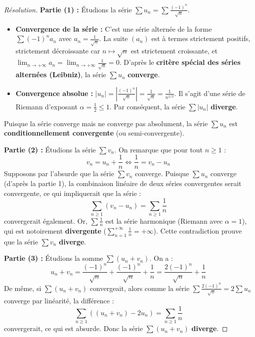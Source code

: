 \documentclass[12pt,a4paper]{report}
\begin{document}
\begin{proof}[Résolution]
\textbf{Partie (1) :} Étudions la série $\sum u_n = \sum \frac{(-1)^n}{\sqrt{n}}$.
\begin{itemize}
    \item \textbf{Convergence de la série :} C'est une série alternée de la forme $\sum (-1)^n a_n$ avec $a_n = \frac{1}{\sqrt{n}}$. 
    La suite $(a_n)$ est à termes strictement positifs, strictement décroissante car $n \mapsto \sqrt{n}$ est strictement croissante, et $\lim_{n \to +\infty} a_n = \lim_{n \to +\infty} \frac{1}{\sqrt{n}} = 0$.
    D'après le \textbf{critère spécial des séries alternées (Leibniz)}, la série $\sum u_n$ \textbf{converge}.
    \item \textbf{Convergence absolue :}
    $|u_n| = \left| \frac{(-1)^n}{\sqrt{n}} \right| = \frac{1}{\sqrt{n}} = \frac{1}{n^{1/2}}$.
    Il s'agit d'une série de Riemann d'exposant $\alpha = \frac{1}{2} \le 1$. Par conséquent, la série $\sum |u_n|$ \textbf{diverge}.
\end{itemize}
Puisque la série converge mais ne converge pas absolument, la série $\sum u_n$ est \textbf{conditionnellement convergente} (ou semi-convergente).

\textbf{Partie (2) :} Étudions la série $\sum v_n$.
On remarque que pour tout $n \ge 1$ :
\[ v_n = u_n + \frac{1}{n} \iff \frac{1}{n} = v_n - u_n \]
Supposons par l'absurde que la série $\sum v_n$ converge. 
Puisque $\sum u_n$ converge (d'après la partie 1), la combinaison linéaire de deux séries convergentes serait convergente, ce qui impliquerait que la série :
\[ \sum_{n \ge 1} (v_n - u_n) = \sum_{n \ge 1} \frac{1}{n} \]
convergerait également. Or, $\sum \frac{1}{n}$ est la série harmonique (Riemann avec $\alpha = 1$), qui est notoirement \textbf{divergente} ($\sum_{n=1}^{+\infty} \frac{1}{n} = +\infty$).
Cette contradiction prouve que la série $\sum v_n$ \textbf{diverge}.

\textbf{Partie (3) :} Étudions la somme $\sum (u_n + v_n)$.
On a :
\[ u_n + v_n = \frac{(-1)^n}{\sqrt{n}} + \frac{(-1)^n}{\sqrt{n}} + \frac{1}{n} = \frac{2(-1)^n}{\sqrt{n}} + \frac{1}{n} \]
De même, si $\sum (u_n + v_n)$ convergeait, alors comme la série $\sum \frac{2(-1)^n}{\sqrt{n}} = 2 \sum u_n$ converge par linéarité, la différence :
\[ \sum_{n \ge 1} \left( (u_n + v_n) - 2u_n \right) = \sum_{n \ge 1} \frac{1}{n} \]
convergerait, ce qui est absurde. Donc la série $\sum (u_n + v_n)$ \textbf{diverge}.


\end{proof}
\end{document}
